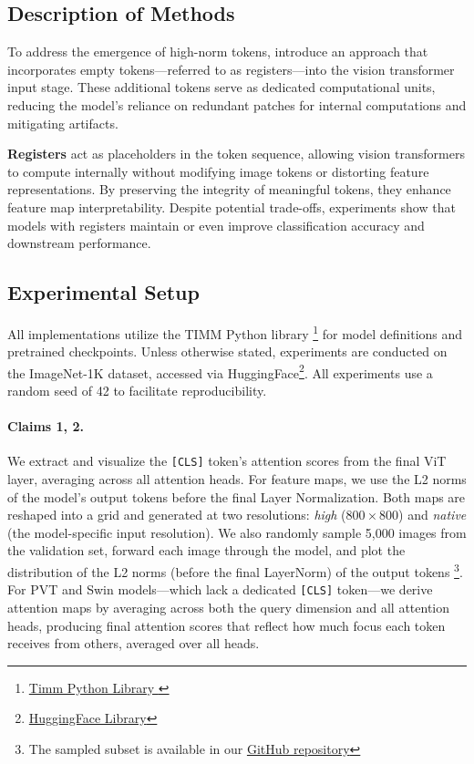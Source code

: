 \documentclass[10pt]{article} \usepackage[preprint]{tmlr}
\begin{document}
\subsection{Description of Methods}
To address the emergence of high-norm tokens, \citet{darcet2024registers} introduce an approach that incorporates empty tokens—referred to as registers—into the vision transformer input stage. These additional tokens serve as dedicated computational units, reducing the model’s reliance on redundant patches for internal computations and mitigating artifacts.

\textbf{Registers} act as placeholders in the token sequence, allowing vision transformers to compute internally without modifying image tokens or distorting feature representations. By preserving the integrity of meaningful tokens, they enhance feature map interpretability. Despite potential trade-offs, experiments show that models with registers maintain or even improve classification accuracy and downstream performance.

\subsection{Experimental Setup}
\label{sec:experimental_setup}
All implementations utilize the TIMM Python library \footnote{\href{https://github.com/rwightman/pytorch-image-models}{Timm Python Library }} for model definitions and pretrained checkpoints. Unless otherwise stated, experiments are conducted on the ImageNet-1K \citep{deng2009imagenet} dataset, accessed via HuggingFace\footnote{\href{https://huggingface.com}{HuggingFace Library}}. All experiments use a random seed of 42 to facilitate reproducibility.

\paragraph{Claims 1, 2.}
We extract and visualize the \texttt{[CLS]} token's attention scores from the final ViT layer, averaging across all attention heads. For feature maps, we use the L2 norms of the model's output tokens before the final Layer Normalization. Both maps are reshaped into a grid and generated at two resolutions: \emph{high} ($800 \times 800$) and \emph{native} (the model-specific input resolution). We also randomly sample 5,000 images from the validation set, forward each image through the model, and plot the distribution of the L2 norms (before the
final LayerNorm) of the output tokens \footnote{The sampled subset is available in our \href{https://anonymous.4open.science/r/VitReg-4C8B/}{GitHub repository}}.
For PVT \citep{wang2022pvt} and Swin \citep{liu2021swin} models—which lack a dedicated \texttt{[CLS]} token—we derive attention maps by averaging across both the query dimension and all attention heads, producing final attention scores that reflect how much focus each token receives from others, averaged over all heads.
\end{document}
